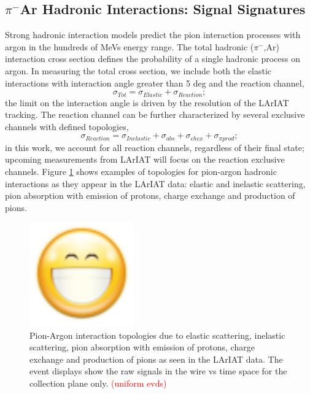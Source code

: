 \documentclass[aps,prl,twocolumn,showpacs,superscriptaddress,groupedaddress]{revtex4}  %
\begin{document}
\subsection{\label{sec:Sign} $\pi^{-}$Ar Hadronic Interactions: Signal Signatures}
Strong hadronic interaction models \cite{9780198520085,9780471779957} predict the pion interaction processes with argon in the hundreds of MeVs energy range. 
The total hadronic ($\pi^{-}$,Ar) interaction cross section defines the probability of a single hadronic process on argon.  In measuring the total cross section, we include both the elastic interactions with interaction angle greater than 5 deg and  the reaction channel, 
\begin{equation}
\sigma_{Tot} = \sigma_{Elastic}+ \sigma_{Reaction}; 
\end{equation}
the limit on the interaction angle is driven by the resolution of the LArIAT tracking.
The reaction channel can be further characterized by several exclusive channels with defined topologies,
\begin{equation}
\sigma_{Reaction} = \sigma_{Inelastic} + \sigma_{abs} + \sigma_{chex}+ \sigma_{\pi prod};
\end{equation}
in this work, we account for all reaction channels, regardless of their final state; upcoming measurements from LArIAT will focus on the reaction exclusive channels.
Figure \ref{fig:PionsEvd} shows examples of topologies for pion-argon hadronic interactions as they appear in the  LArIAT data: elastic and inelastic scattering, pion absorption with emission of protons, charge exchange and production of pions.


\begin{figure}
  \centering  
\includegraphics[width =0.4\textwidth]{face-smile-big.png}
\caption{Pion-Argon interaction topologies due to elastic scattering, inelastic scattering, pion absorption with emission of protons, charge exchange and production of pions as seen in the LArIAT data. The event displays show the raw signals in the wire vs time space for the collection plane only. \textcolor{red}{(uniform evds)}}
\label{fig:PionsEvd}
\end{figure}
\end{document}
